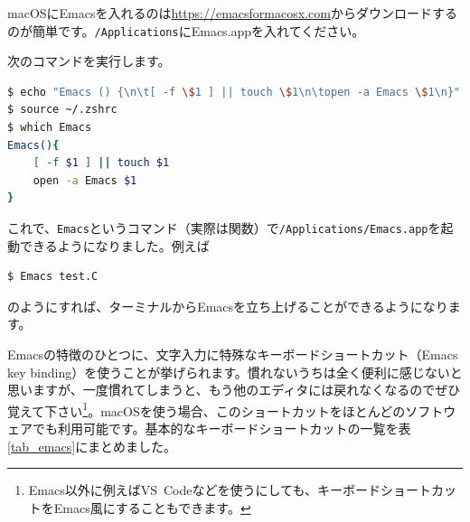 macOSにEmacsを入れるのは\url{https://emacsformacosx.com}からダウンロードするのが簡単です。\texttt{/Applications}にEmacs.appを入れてください。

次のコマンドを実行します。
\begin{lstlisting}[language=bash]
$ echo "Emacs () {\n\t[ -f \$1 ] || touch \$1\n\topen -a Emacs \$1\n}" >> ~/.zshrc
$ source ~/.zshrc
$ which Emacs
Emacs(){
	[ -f $1 ] || touch $1
	open -a Emacs $1
}
\end{lstlisting}
これで、\texttt{Emacs}というコマンド（実際は関数）で\texttt{/Applications/Emacs.app}を起動できるようになりました。例えば
\begin{lstlisting}[language=bash]
$ Emacs test.C
\end{lstlisting}
のようにすれば、ターミナルからEmacsを立ち上げることができるようになります。

Emacsの特徴のひとつに、文字入力に特殊なキーボードショートカット（Emacs key binding）を使うことが挙げられます。慣れないうちは全く便利に感じないと思いますが、一度慣れてしまうと、もう他のエディタには戻れなくなるのでぜひ覚えて下さい\footnote{Emacs以外に例えばVS~Codeなどを使うにしても、キーボードショートカットをEmacs風にすることもできます。}。macOSを使う場合、このショートカットをほとんどのソフトウェアでも利用可能です。基本的なキーボードショートカットの一覧を表\ref{tab_emacs}にまとめました。

